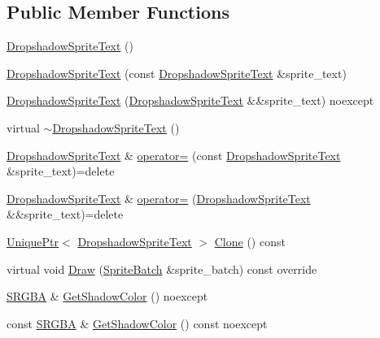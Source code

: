 \subsection*{Public Member Functions}
\begin{DoxyCompactItemize}
\item 
\hyperlink{classmage_1_1_dropshadow_sprite_text_a74003c0961117f9c04e2f4b70e71a74c}{Dropshadow\+Sprite\+Text} ()
\item 
\hyperlink{classmage_1_1_dropshadow_sprite_text_af0a9422a32ed8962d6c691fe76f44c30}{Dropshadow\+Sprite\+Text} (const \hyperlink{classmage_1_1_dropshadow_sprite_text}{Dropshadow\+Sprite\+Text} \&sprite\+\_\+text)
\item 
\hyperlink{classmage_1_1_dropshadow_sprite_text_a79367c23991f486a8548aac6fce36691}{Dropshadow\+Sprite\+Text} (\hyperlink{classmage_1_1_dropshadow_sprite_text}{Dropshadow\+Sprite\+Text} \&\&sprite\+\_\+text) noexcept
\item 
virtual \hyperlink{classmage_1_1_dropshadow_sprite_text_a561b1be59d05bccb680969be792c0e28}{$\sim$\+Dropshadow\+Sprite\+Text} ()
\item 
\hyperlink{classmage_1_1_dropshadow_sprite_text}{Dropshadow\+Sprite\+Text} \& \hyperlink{classmage_1_1_dropshadow_sprite_text_a83846227264396ee5b6ca44304bc404a}{operator=} (const \hyperlink{classmage_1_1_dropshadow_sprite_text}{Dropshadow\+Sprite\+Text} \&sprite\+\_\+text)=delete
\item 
\hyperlink{classmage_1_1_dropshadow_sprite_text}{Dropshadow\+Sprite\+Text} \& \hyperlink{classmage_1_1_dropshadow_sprite_text_aea70f005fd9eae94aee9da27aa54534b}{operator=} (\hyperlink{classmage_1_1_dropshadow_sprite_text}{Dropshadow\+Sprite\+Text} \&\&sprite\+\_\+text)=delete
\item 
\hyperlink{namespacemage_a3316d7143a973e37adf1110f2e80ca31}{Unique\+Ptr}$<$ \hyperlink{classmage_1_1_dropshadow_sprite_text}{Dropshadow\+Sprite\+Text} $>$ \hyperlink{classmage_1_1_dropshadow_sprite_text_a0dcce82b4a83fbd469d68adba21af220}{Clone} () const
\item 
virtual void \hyperlink{classmage_1_1_dropshadow_sprite_text_af76422c9812d7dc38e9b98e587103c67}{Draw} (\hyperlink{classmage_1_1_sprite_batch}{Sprite\+Batch} \&sprite\+\_\+batch) const override
\item 
\hyperlink{structmage_1_1_s_r_g_b_a}{S\+R\+G\+BA} \& \hyperlink{classmage_1_1_dropshadow_sprite_text_ae397446f32257519efb24766edc0d0e8}{Get\+Shadow\+Color} () noexcept
\item 
const \hyperlink{structmage_1_1_s_r_g_b_a}{S\+R\+G\+BA} \& \hyperlink{classmage_1_1_dropshadow_sprite_text_ac441bdd3e94d80a27d33af2a01207704}{Get\+Shadow\+Color} () const noexcept
\end{DoxyCompactItemize}
